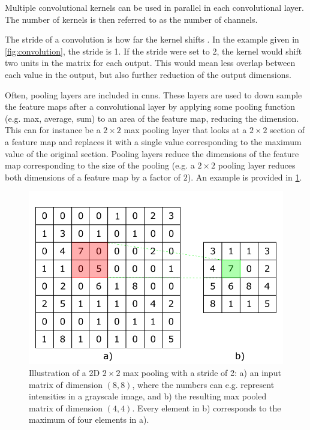 Multiple convolutional kernels can be used in parallel in each convolutional layer. The number of kernels is then referred to as the number of channels. 

The stride of a convolution is how far the kernel shifts \cite{oshea2015introduction}. In the example given in \cref{fig:convolution}, the stride is 1. If the stride were set to 2, the kernel would shift two units in the matrix for each output. This would mean less overlap between each value in the output, but also further reduction of the output dimensions. 

Often, pooling layers are included in \gls{cnn}s. These layers are used to down sample the feature maps after a convolutional layer by applying some pooling function (e.g. max, average, sum) to an area of the feature map, reducing the dimension. This can for instance be a $2\times2$ max pooling layer that looks at a $2\times2$ section of a feature map and replaces it with a single value corresponding to the maximum value of the original section. Pooling layers reduce the dimensions of the feature map corresponding to the size of the pooling (e.g. a $2\times2$ pooling layer reduces both dimensions of a feature map by a factor of $2$). An example is provided in \cref{fig:maxpool}. 

\begin{figure}[htbp]  
    \centering
    \includegraphics[width=.7\textwidth]{figures/maxpool.pdf}
    \caption[Illustration of a max pooling operation]{Illustration of a 2D $2\times2$ max pooling with a stride of 2: a) an input matrix of dimension $(8,8)$, where the numbers can e.g. represent intensities in a grayscale image, and b) the resulting max pooled matrix of dimension $(4,4)$. Every element in b) corresponds to the maximum of four elements in a). }
    \label{fig:maxpool}
\end{figure}

